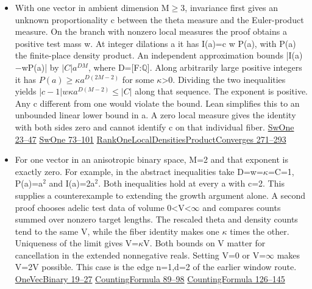 \documentclass[11pt,letterpaper]{article}
\begin{document}
\begin{itemize}
\item 
With one vector in ambient dimension M\ensuremath{\ge}3, invariance first gives an unknown proportionality c between the theta measure and the Euler-product measure. On the branch with nonzero local measures the proof obtains a positive test mass w. At integer dilations a it has I(a)=c w P(a), with P(a) the finite-place density product. An independent approximation bounds |I(a)\ensuremath{-}wP(a)| by \(|C|a^{DM}\), where D=[F:\ensuremath{\mathbb{Q}}]. Along arbitrarily large positive integers it has \(P(a)\geq\kappa a^{D(2M-2)}\) for some \ensuremath{\kappa}>0. Dividing the two inequalities yields \(|c-1|w\kappa a^{D(M-2)}\leq |C|\) along that sequence. The exponent is positive. Any c different from one would violate the bound. Lean simplifies this to an unbounded linear lower bound in a. A zero local measure gives the identity with both sides zero and cannot identify c on that individual fiber. \href{https://github.com/nousentllc/riemann-hypothesis/blob/40e56bab026552e089d7afcfeff08d2defb9c005/src/CompanionTheory/AutomorphicTheory/ThetaDilations/SwOne.lean\#L23-L47}{SwOne 23–47} \href{https://github.com/nousentllc/riemann-hypothesis/blob/40e56bab026552e089d7afcfeff08d2defb9c005/src/CompanionTheory/AutomorphicTheory/ThetaDilations/SwOne.lean\#L73-L101}{SwOne 73–101} \href{https://github.com/nousentllc/riemann-hypothesis/blob/40e56bab026552e089d7afcfeff08d2defb9c005/src/CompanionTheory/SpectralGeometry/LocalGlobalProofs/AdelicAnalysis/RankOneLocalDensitiesProductConverges.lean\#L271-L293}{RankOneLocalDensitiesProductConverges 271–293}

\item 
For one vector in an anisotropic binary space, M=2 and that exponent is exactly zero. For example, in the abstract inequalities take D=w=\ensuremath{\kappa}=C=1, P(a)=a\ensuremath{{}^{2}} and I(a)=2a\ensuremath{{}^{2}}. Both inequalities hold at every a with c=2. This supplies a counterexample to extending the growth argument alone. A second proof chooses adelic test data of volume 0<V<\ensuremath{\infty} and compares counts summed over nonzero target lengths. The rescaled theta and density counts tend to the same V, while the fiber identity makes one \ensuremath{\kappa} times the other. Uniqueness of the limit gives V=\ensuremath{\kappa}V. Both bounds on V matter for cancellation in the extended nonnegative reals. Setting V=0 or V=\ensuremath{\infty} makes V=2V possible. This case is the edge n=1,d=2 of the earlier window route. \href{https://github.com/nousentllc/riemann-hypothesis/blob/40e56bab026552e089d7afcfeff08d2defb9c005/src/Development/WeilBound/RepresentationTheoryGL/SiegelWeilProof/BinaryMassMeans/OneVecBinary.lean\#L19-L27}{OneVecBinary 19–27} \href{https://github.com/nousentllc/riemann-hypothesis/blob/40e56bab026552e089d7afcfeff08d2defb9c005/src/Development/AutomorphicSpectrum/Proofs/BlockDecomposition/CountingFormula.lean\#L89-L98}{CountingFormula 89–98} \href{https://github.com/nousentllc/riemann-hypothesis/blob/40e56bab026552e089d7afcfeff08d2defb9c005/src/Development/AutomorphicSpectrum/Proofs/BlockDecomposition/CountingFormula.lean\#L126-L145}{CountingFormula 126–145}


\end{itemize}
\end{document}
